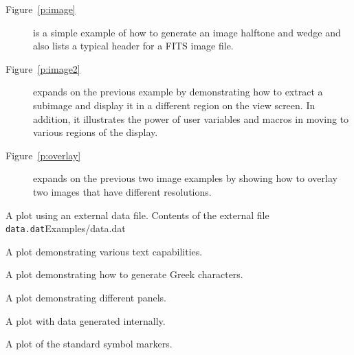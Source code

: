 \begin{description}
  \item[Figure~\ref{p:image}] is a simple example of how to generate an
    image halftone and wedge and also lists a typical header for a
    FITS image file.

  \item[Figure~\ref{p:image2}] expands on the previous example by
    demonstrating how to extract a subimage and display it in a
    different region on the view screen.  In addition, it illustrates
    the power of user variables and macros in
    moving to various regions of the display.

  \item[Figure~\ref{p:overlay}] expands on the previous two image examples by
    showing how to overlay two images that have different resolutions.


\end{description}

\clearevenpage
{}

\clearpage
{}%
{A plot using an external data file.}%
{Contents of the external file {\tt data.dat}}{Examples/data.dat}

\clearpage
{}%
{A plot demonstrating various text capabilities.}{}{}

\clearpage
{}%
{A plot demonstrating how to generate Greek characters.}{}{}

\clearpage
{}%
{A plot demonstrating different panels.}{}{}

\clearpage
{}%
{A plot with data generated internally.}{}{}

\clearpage
{}%
{A plot of the standard symbol markers.}{}{}

